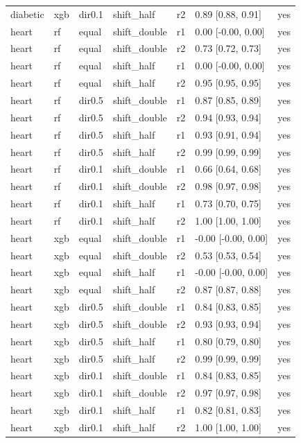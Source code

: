 \begin{tabular}{lllllll}
diabetic & xgb & dir0.1 & shift\_half & r2 & 0.89 [0.88, 0.91] & yes \\
\addlinespace
heart & rf & equal & shift\_double & r1 & 0.00 [-0.00, 0.00] & yes \\
heart & rf & equal & shift\_double & r2 & 0.73 [0.72, 0.73] & yes \\
heart & rf & equal & shift\_half & r1 & 0.00 [-0.00, 0.00] & yes \\
heart & rf & equal & shift\_half & r2 & 0.95 [0.95, 0.95] & yes \\
heart & rf & dir0.5 & shift\_double & r1 & 0.87 [0.85, 0.89] & yes \\
heart & rf & dir0.5 & shift\_double & r2 & 0.94 [0.93, 0.94] & yes \\
heart & rf & dir0.5 & shift\_half & r1 & 0.93 [0.91, 0.94] & yes \\
heart & rf & dir0.5 & shift\_half & r2 & 0.99 [0.99, 0.99] & yes \\
heart & rf & dir0.1 & shift\_double & r1 & 0.66 [0.64, 0.68] & yes \\
heart & rf & dir0.1 & shift\_double & r2 & 0.98 [0.97, 0.98] & yes \\
heart & rf & dir0.1 & shift\_half & r1 & 0.73 [0.70, 0.75] & yes \\
heart & rf & dir0.1 & shift\_half & r2 & 1.00 [1.00, 1.00] & yes \\
heart & xgb & equal & shift\_double & r1 & -0.00 [-0.00, 0.00] & yes \\
heart & xgb & equal & shift\_double & r2 & 0.53 [0.53, 0.54] & yes \\
heart & xgb & equal & shift\_half & r1 & -0.00 [-0.00, 0.00] & yes \\
heart & xgb & equal & shift\_half & r2 & 0.87 [0.87, 0.88] & yes \\
heart & xgb & dir0.5 & shift\_double & r1 & 0.84 [0.83, 0.85] & yes \\
heart & xgb & dir0.5 & shift\_double & r2 & 0.93 [0.93, 0.94] & yes \\
heart & xgb & dir0.5 & shift\_half & r1 & 0.80 [0.79, 0.80] & yes \\
heart & xgb & dir0.5 & shift\_half & r2 & 0.99 [0.99, 0.99] & yes \\
heart & xgb & dir0.1 & shift\_double & r1 & 0.84 [0.83, 0.85] & yes \\
heart & xgb & dir0.1 & shift\_double & r2 & 0.97 [0.97, 0.98] & yes \\
heart & xgb & dir0.1 & shift\_half & r1 & 0.82 [0.81, 0.83] & yes \\
heart & xgb & dir0.1 & shift\_half & r2 & 1.00 [1.00, 1.00] & yes \\
\bottomrule
\end{tabular}

